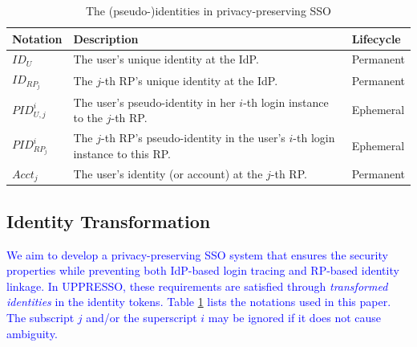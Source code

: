 \begin{table}
\footnotesize
    \caption{The (pseudo-)identities in privacy-preserving SSO}
    \centering
    \begin{tabular}{|p{1.0cm}|p{5.1cm}|p{1.13cm}|} \hline
    {\textbf{Notation}} & {\textbf{Description}} & {\textbf{Lifecycle}} \\ \hline
    {$ID_U$} & {The user's unique identity at the IdP.} & {Permanent} \\ \hline
    {$ID_{RP_j}$} & {The $j$-th RP's unique identity at the IdP.} & {Permanent} \\ \hline
    {$PID_{U,j}^i$} & {The user's pseudo-identity in her $i$-th login instance to the $j$-th RP.} & {Ephemeral} \\ \hline
    {$PID_{RP_j}^i$} & {The $j$-th RP's pseudo-identity in the user's $i$-th login instance to this RP.} & {Ephemeral} \\ \hline
    {$Acct_j$} & {The user's identity (or account) at the $j$-th RP.} & {Permanent} \\ \hline
    \end{tabular}
    \label{tbl:notations-dilemma}
\end{table}

\subsection{Identity Transformation}
\label{subsec:solutions}

\textcolor{blue}{We aim to develop a privacy-preserving SSO system that ensures the security properties while preventing both IdP-based login tracing and RP-based identity linkage.
In UPPRESSO, these requirements are satisfied through \emph{transformed identities} in the identity tokens. Table \ref{tbl:notations-dilemma} lists the notations used in this paper.
The subscript $j$ and/or the superscript $i$ may be ignored if it does not cause ambiguity.}

